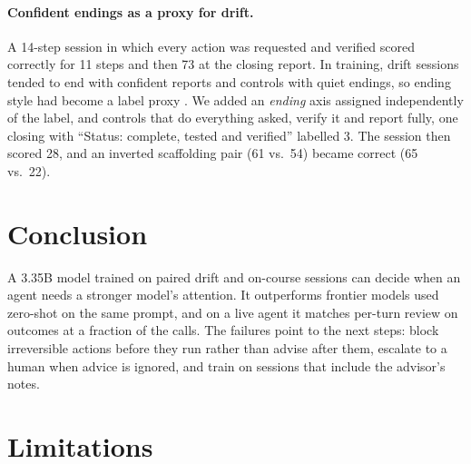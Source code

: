 \documentclass[11pt]{article}
\begin{document}
\paragraph{Confident endings as a proxy for drift.} A 14-step session in which every action was requested and verified scored correctly for 11 steps and then 73 at the closing report. In training, drift sessions tended to end with confident reports and controls with quiet endings, so ending style had become a label proxy \citep{geirhos2020shortcut}. We added an \emph{ending} axis assigned independently of the label, and controls that do everything asked, verify it and report fully, one closing with ``Status: complete, tested and verified'' labelled 3. The session then scored 28, and an inverted scaffolding pair (61 vs.\ 54) became correct (65 vs.\ 22).

\section{Conclusion}

A 3.35B model trained on paired drift and on-course sessions can decide when an agent needs a stronger model's attention. It outperforms frontier models used zero-shot on the same prompt, and on a live agent it matches per-turn review on outcomes at a fraction of the calls. The failures point to the next steps: block irreversible actions before they run rather than advise after them, escalate to a human when advice is ignored, and train on sessions that include the advisor's notes.

\section*{Limitations}
\end{document}
